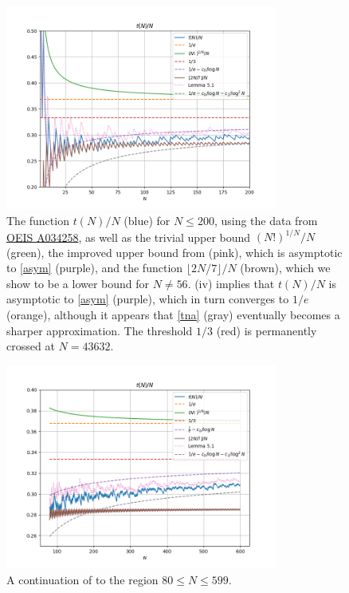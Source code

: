 \documentclass[12pt,a4paper,reqno]{amsart}
\numberwithin{equation}{section}
\theoremstyle{plain}
\theoremstyle{definition}
\begin{document}
\begin{figure}
  \centering
  \includegraphics[width=0.8\textwidth]{newplot_200.png}
  \caption{The function $t(N)/N$ (blue) for $N \leq 200$, using the data from \href{https://oeis.org/A034258}{OEIS A034258}, as well as the trivial upper bound $(N!)^{1/N}/N$ (green), the improved upper bound from  (pink), which is asymptotic to \eqref{asym} (purple), and the function $\lfloor 2N/7 \rfloor/N$ (brown), which we show to be a lower bound for $N \neq 56$.  (iv) implies that $t(N)/N$ is asymptotic to \eqref{asym} (purple), which in turn converges to $1/e$ (orange), although it appears that \eqref{tna} (gray) eventually becomes a sharper approximation.  The threshold $1/3$ (red) is permanently crossed at $N=43632$. 
  }\label{fig1}
  \end{figure}
  
  \begin{figure}
    \centering
    \includegraphics[width=0.8\textwidth]{newplot_600_all.png}
    \caption{A continuation of  to the region $80 \leq N \leq 599$. }\label{fig1-alt}
  \end{figure}
  
\end{document}
